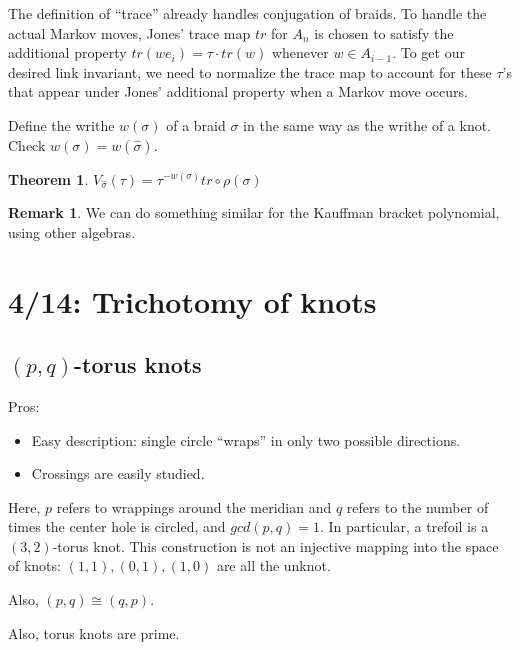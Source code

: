 \documentclass[11pt]{article}
\theoremstyle{plain}
\newtheorem{thm}{Theorem}
\theoremstyle{definition}
\newtheorem{remark}{Remark}
\begin{document}
\bigskip
The definition of ``trace'' already handles conjugation of braids. To handle the actual Markov moves, Jones' trace map $tr$ for $A_n$ is chosen to satisfy the additional property $tr(we_i)=\tau\cdot tr(w)$ whenever $w\in A_{i-1}$. To get our desired link invariant, we need to normalize the trace map to account for these $\tau$'s that appear under Jones' additional property when a Markov move occurs.

\bigskip
Define the writhe $w(\sigma)$ of a braid $\sigma$ in the same way as the writhe of a knot. Check $w(\sigma)=w(\hat\sigma)$.

\begin{thm}
$V_{\widehat\sigma}(\tau)=\tau^{-w(\sigma)}tr\circ\rho(\sigma)$
\end{thm}



\begin{remark}
We can do something similar for the Kauffman bracket polynomial, using other algebras.
\end{remark}









\clearpage
\section{4/14: Trichotomy of knots}


\subsection{$(p,q)$-torus knots}

Pros:

\begin{itemize}
  \item Easy description: single circle ``wraps'' in only two possible directions.
  \item Crossings are easily studied.
\end{itemize}

Here, $p$ refers to wrappings around the meridian and $q$ refers to the number of times the center hole is circled, and $gcd(p,q)=1$. In particular, a trefoil is a $(3,2)$-torus knot.
This construction is not an injective mapping into the space of knots: $(1,1), (0,1), (1, 0)$ are all the unknot.

Also, $(p,q) \cong (q, p)$.

Also, torus knots are prime.
\end{document}
